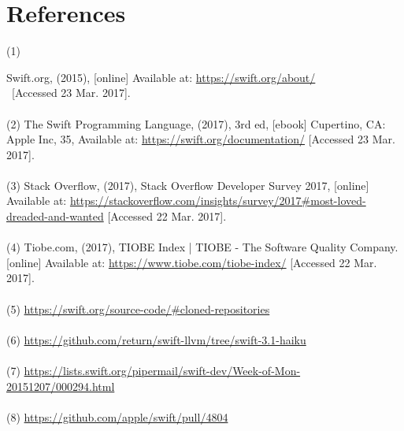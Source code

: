 \documentclass[12pt]{article}
\begin{document}
\section*{References}
\hypertarget{(1)}{(1)} Swift.org, (2015), [online] Available at: \href{https://swift.org/about/}{https://swift.org/about/} \\\ [Accessed 23 Mar. 2017].\vspace{0.25cm}\\
\\\hypertarget{(2)}{(2)} The Swift Programming Language, (2017), 3rd ed, [ebook] Cupertino, CA: Apple Inc, 35, Available at: \href{https://swift.org/documentation/}{https://swift.org/documentation/} [Accessed 23 Mar. 2017].\\
\\\hypertarget{(3)}{(3)} Stack Overflow, (2017), Stack Overflow Developer Survey 2017, [online] Available at: \href{https://stackoverflow.com/insights/survey/2017\#most-loved-dreaded-and-wanted}{https://stackoverflow.com/insights/survey/2017\#most-loved-dreaded-and-wanted} [Accessed 22 Mar. 2017]. \vspace{0.25cm}\\
\\\hypertarget{(4)}{(4)} Tiobe.com, (2017), TIOBE Index | TIOBE - The Software Quality Company. [online] Available at: \href{https://www.tiobe.com/tiobe-index/}{https://www.tiobe.com/tiobe-index/} [Accessed 22 Mar. 2017]. \vspace{-0.125cm}\\
\\\hypertarget{(5)}{(5)} \href{https://swift.org/source-code/\#cloned-repositories}{https://swift.org/source-code/\#cloned-repositories} \vspace{0.125cm}\\
\\\hypertarget{(6)}{(6)} \href{https://github.com/return/swift-llvm/tree/swift-3.1-haiku}{https://github.com/return/swift-llvm/tree/swift-3.1-haiku}\vspace{0.125cm}\\
\\\hypertarget{(7)}{(7)} \href{https://lists.swift.org/pipermail/swift-dev/Week-of-Mon-20151207/000294.html}{https://lists.swift.org/pipermail/swift-dev/Week-of-Mon-20151207/000294.html} \vspace{0.125cm}\\
\\\hypertarget{(8)}{(8)} \href{https://github.com/apple/swift/pull/4804}{https://github.com/apple/swift/pull/4804}\vspace{0.125cm}\\
\end{document}
